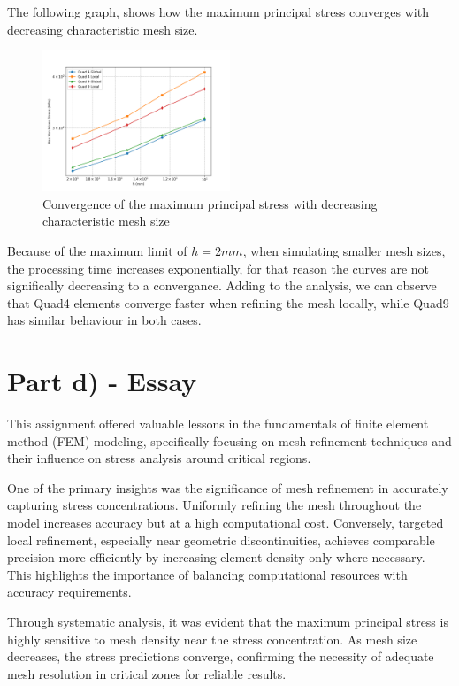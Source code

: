The following graph, shows how the maximum principal stress converges with decreasing characteristic mesh size.

\begin{figure}[H]
    \centering
    \includegraphics[width=0.5\textwidth]{GRAFICOS/convergencia.png}
    \caption{Convergence of the maximum principal stress with decreasing characteristic mesh size}
    \label{fig:convergence}
\end{figure}

Because of the maximum limit of $h=2mm$, when simulating smaller mesh sizes, the processing time increases exponentially, for that reason the curves are not significally decreasing to a convergance. Adding to the analysis, we can observe that Quad4 elements converge faster when refining the mesh locally, while Quad9 has similar behaviour in both cases.

\section{Part d) - Essay}

This assignment offered valuable lessons in the fundamentals of finite element method (FEM) modeling, specifically focusing on mesh refinement techniques and their influence on stress analysis around critical regions.

One of the primary insights was the significance of mesh refinement in accurately capturing stress concentrations. Uniformly refining the mesh throughout the model increases accuracy but at a high computational cost. Conversely, targeted local refinement, especially near geometric discontinuities, achieves comparable precision more efficiently by increasing element density only where necessary. This highlights the importance of balancing computational resources with accuracy requirements.

Through systematic analysis, it was evident that the maximum principal stress is highly sensitive to mesh density near the stress concentration. As mesh size decreases, the stress predictions converge, confirming the necessity of adequate mesh resolution in critical zones for reliable results.

